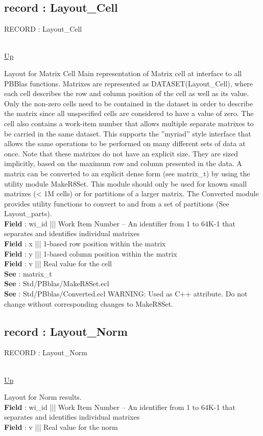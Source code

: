 \subsection*{record : Layout\_Cell}
\hypertarget{ecldoc:pbblas.types.layout_cell}{RECORD : Layout\_Cell} \\
\hyperlink{ecldoc:PBblas.Types}{Up} \\
\par
Layout for Matrix Cell Main representation of Matrix cell at interface to all PBBlas functions. Matrixes are represented as DATASET(Layout\_Cell), where each cell describes the row and column position of the cell as well as its value. Only the non-zero cells need to be contained in the dataset in order to describe the matrix since all unspecified cells are considered to have a value of zero. The cell also contains a work-item number that allows multiple separate matrixes to be carried in the same dataset. This supports the ''myriad'' style interface that allows the same operations to be performed on many different sets of data at once. Note that these matrixes do not have an explicit size. They are sized implicitly, based on the maximum row and column presented in the data. A matrix can be converted to an explicit dense form (see matrix\_t) by using the utility module MakeR8Set. This module should only be used for known small matrixes (< 1M cells) or for partitions of a larger matrix. The Converted module provides utility functions to convert to and from a set of partitions (See Layout\_parts). \\
\textbf{Field} : wi\_id ||| Work Item Number -- An identifier from 1 to 64K-1 that separates and identifies individual matrixes \\
\textbf{Field} : x ||| 1-based row position within the matrix \\
\textbf{Field} : y ||| 1-based column position within the matrix \\
\textbf{Field} : v ||| Real value for the cell \\
\textbf{See} : matrix\_t \\
\textbf{See} : Std/PBblas/MakeR8Set.ecl \\
\textbf{See} : Std/PBblas/Converted.ecl WARNING: Used as C++ attribute. Do not change without corresponding changes to MakeR8Set. \\
\subsection*{record : Layout\_Norm}
\hypertarget{ecldoc:pbblas.types.layout_norm}{RECORD : Layout\_Norm} \\
\hyperlink{ecldoc:PBblas.Types}{Up} \\
\par
Layout for Norm results. \\
\textbf{Field} : wi\_id ||| Work Item Number -- An identifier from 1 to 64K-1 that separates and identifies individual matrixes \\
\textbf{Field} : v ||| Real value for the norm \\

